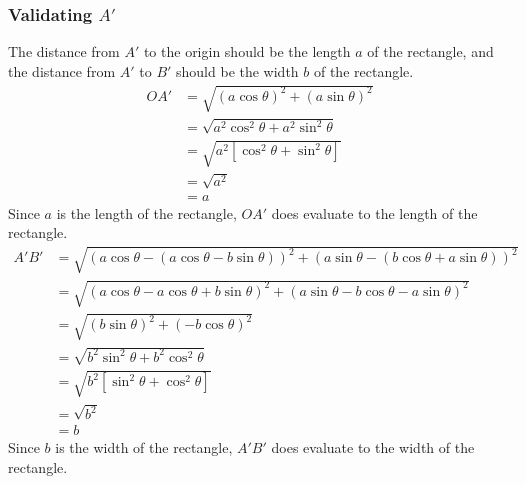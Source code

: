 \documentclass{article}
\begin{document}
        \subsubsection{Validating $A'$} The distance from $A'$ to the origin should be the length $a$ of the rectangle, and the distance from $A'$ to $B'$ should be the width $b$ of the rectangle.
        \begin{align*}
	        OA' &= \sqrt{(a\cos\theta)^2 + (a\sin\theta)^2} \\
	        &= \sqrt{a^2\cos^2{\theta} + a^2\sin^2{\theta}} \\
	        &= \sqrt{a^2[\cos^2{\theta} + \sin^2{\theta}]} \\
	        &= \sqrt{a^2} \\
	        &= a
        \end{align*}
        Since $a$ is the length of the rectangle, $OA'$ does evaluate to the length of the rectangle.
        \begin{align*}
        	A'B'&= \sqrt{(a\cos{\theta} - (a\cos{\theta} -b\sin{\theta}))^2 + (a\sin{\theta} - (b\cos{\theta} + a\sin{\theta}))^2} \\
        	&= \sqrt{(a\cos{\theta} - a\cos{\theta} + b\sin{\theta})^2 + (a\sin{\theta} - b\cos{\theta} - a\sin{\theta})^2} \\
        	&= \sqrt{(b\sin{\theta})^2 + (- b\cos{\theta})^2} \\
        	&= \sqrt{b^2\sin^2{\theta} + b^2\cos^2{\theta}} \\
        	&= \sqrt{b^2[\sin^2{\theta} + \cos^2{\theta}]} \\
        	&= \sqrt{b^2} \\
        	&= b
        \end{align*}
        Since $b$ is the width of the rectangle, $A'B'$ does evaluate to the width of the rectangle.
\end{document}
